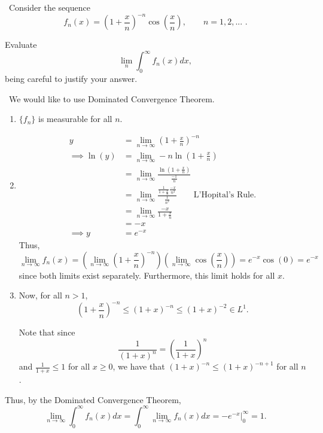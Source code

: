 \documentclass[12pt]{Homework}
\begin{document}
\begin{problem} $\,$
Consider the sequence $$f_n(x)=\left(1+\frac{x}{n}\right)^{-n}\cos\left(\frac{x}{n}\right),\qquad n=1,2,...\,\,.$$

Evaluate $$\lim_n\int_0^\infty f_n(x)dx,$$ being careful to justify your answer.
\end{problem}


\begin{solution}$\,$
We would like to use Dominated Convergence Theorem.
\begin{enumerate}
    \item $\{f_n\}$ is measurable for all $n$.
    \item \begin{align*}
        y&=\lim_{n\to\infty}\left(1+\frac{x}{n}\right)^{-n}\\
        \implies \ln(y)&=\lim_{n\to\infty}-n\ln\left(1+\frac{x}{n}\right)\\
        &=\lim_{n\to\infty}\frac{\ln\left(1+\frac{x}{n}\right)}{\frac{-1}{n}}\\
        &=\lim_{n\to\infty}\frac{\frac{1}{1+\frac{x}{n}}\frac{-x}{n^2}}{\frac{1}{n^2}}\qquad\text{L'Hopital's Rule.}\\
        &=\lim_{n\to\infty}\frac{-x}{1+\frac{x}{n}}\\
        &=-x\\
        \implies y&=e^{-x}
    \end{align*}
    Thus, $$\lim_{n\to\infty}f_n(x)=\left(\lim_{n\to\infty}\left(1+\frac{x}{n}\right)^{-n}\right)\left(\lim_{n\to\infty}\cos\left(\frac{x}{n}\right)\right)=e^{-x}\cos(0)=e^{-x}$$ since both limits exist separately. Furthermore, this limit holds for all $x$.
    \item Now, for all $n>1$, $$\left(1+\frac{x}{n}\right)^{-n}\le\left(1+x\right)^{-n}\le(1+x)^{-2}\in L^1.$$
    
    Note that since $$\frac{1}{(1+x)^n}=\left(\frac{1}{1+x}\right)^n$$ and $\frac{1}{1+x}\le 1$ for all $x\ge0$, we have that $(1+x)^{-n}\le(1+x)^{-n+1}$ for all $n$. 
\end{enumerate}

Thus, by the Dominated Convergence Theorem, $$\lim_{n\to\infty}\int_0^\infty f_n(x)dx=\int_0^\infty\lim_{n\to\infty}f_n(x)dx=-e^{-x}\bigg|_0^\infty=1.$$
\begin{comment}

    Now, using calculus, we let $g(x)=-n\ln\left(1+\frac{x}{n}\right)+x$. Since $x\ge0$, for all $n>1$, we have that $$\frac{d}{dx}g(x)=\frac{d}{dx}\left(-n\ln\left(1+\frac{x}{n}\right)+x\right)=\frac{-n}{n+x}+k=\frac{(k-1)n+x}{n+x}\ge0$$ and since $g(0)=0$, we have that $g(x)\ge0$ for all $x\ge0$ and so $$-n\ln\left(1+\frac{x}{n}\right)\ge -x\implies \left(1+\frac{x}{n}\right)^{-n}\ge e^{-x}.$$
    
    Finally, This implies that 
    
    $$f_n(x)\le \left(1+\frac{x}{n}\right)^{-n}\le e^{-x}\in L^1([0,\infty)).$$
    \begin{center}
    \texttt{[image: hw/Qual1.jpg]}
\end{center}
\end{comment}
\end{solution}
\newpage
\end{document}
